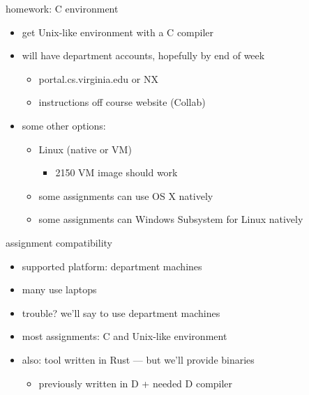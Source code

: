 \begin{frame}{homework: C environment}
    \begin{itemize}
    \item get Unix-like environment with a C compiler
    \item will have department accounts, hopefully by end of week
        \begin{itemize}
        \item portal.cs.virginia.edu or NX
        \item instructions off course website (Collab)
        \end{itemize}
    \item some other options:
        \begin{itemize}
        \item Linux (native or VM)
            \begin{itemize}
            \item 2150 VM image should work
            \end{itemize}
        \item some assignments can use OS X natively
        \item some assignments can Windows Subsystem for Linux natively
        \end{itemize}
    \end{itemize}
\end{frame}

\begin{frame}{assignment compatibility}
    \begin{itemize}
    \item supported platform: department machines
    \item many use laptops 
    \item trouble? we'll say to use department machines
    \vspace{.5cm}
    \item most assignments: C and Unix-like environment
    \item also: tool written in Rust --- but we'll provide binaries
        \begin{itemize}
        \item previously written in D + needed D compiler
        \end{itemize}
    \end{itemize}
\end{frame}
